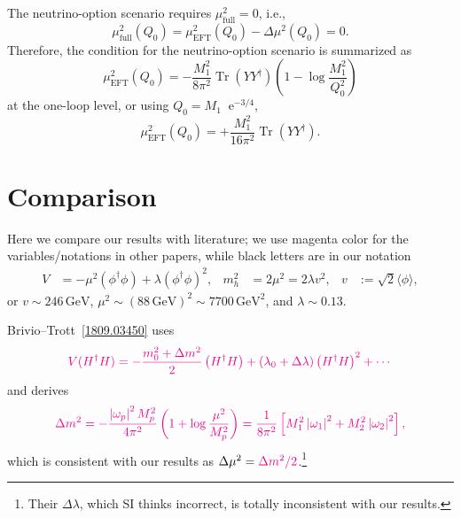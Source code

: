 \documentclass[a4paper,11pt]{scrartcl}
\numberwithin{equation}{section}
\newcommand\w[1]{_{\mathrm{#1}}}
\newcommand\ee{\mathop{}\!\mathrm{e}}
\DeclareMathOperator{\Tr}{\mathrm{Tr}}
\newcommand\vev[1]{\langle#1\rangle}
\newcommand\unit[1]{\,\mathrm{#1}\xspace}
\newcommand\GeV{\unit{GeV}}
\newcommand{\C}{\color{magenta}}
\begin{document}
The neutrino-option scenario requires $\mu^2\w{full}=0$, i.e.,
\begin{equation}
 \mu^2\w{full}(Q_0) = \mu^2\w{EFT}(Q_0) - \Delta \mu^2(Q_0) = 0.
\end{equation}
Therefore, the condition for the neutrino-option scenario is summarized as
\begin{equation}
 \mu^2\w{EFT}(Q_0) = -\frac{M_1^2}{8\pi^2}\Tr(YY^\dagger)\left(1-\log\frac{M_1^2}{Q_0^2}\right)
\end{equation}
at the one-loop level, or using $Q_0=M_1\ee^{-3/4}$,
\begin{equation}
 \mu^2\w{EFT}(Q_0) = +\frac{M_1^2}{16\pi^2}\Tr(YY^\dagger).
\end{equation}




\appendix
\section{Comparison}
Here we compare our results with literature; we use {\C magenta color} for the variables/notations in other papers, while black letters are in our notation
\begin{align*}
 V &= -\mu^2(\phi^\dagger \phi) + \lambda(\phi^\dagger \phi)^2,&
m_h^2 &= 2\mu^2=2\lambda v^2,&
 v &:= \sqrt2 \vev{\phi},
\end{align*}
or $v\sim246\GeV$, $\mu^2\sim(88\GeV)^2\sim7700\GeV^2$, and $\lambda\sim0.13$.

Brivio--Trott~\ref{1809.03450} uses
\begin{equation}
\C
 V(H^\dagger H) = -\frac{m_{0}^{2}+\Delta m^{2}}{2}\left(H^{\dagger} H\right)+\left(\lambda_{0}+\Delta \lambda\right)\left(H^{\dagger} H\right)^{2} + \cdots
\end{equation}
and derives
\begin{equation}
\C
\Delta m^{2}=-\frac{\left|\omega_{p}\right|^{2} M_{p}^{2}}{4 \pi^{2}}\left(1+\log \frac{\mu^{2}}{M_{p}^{2}}\right)=\frac{1}{8 \pi^{2}}\left[M_{1}^{2}\left|\omega_{1}\right|^{2}+M_{2}^{2}\left|\omega_{2}\right|^{2}\right],
\end{equation}
which is consistent with our results as $\Delta \mu^2 = \C\Delta m^2/2$.\footnote{Their $\Delta \lambda$, which SI thinks incorrect, is totally inconsistent with our results.}
\end{document}
